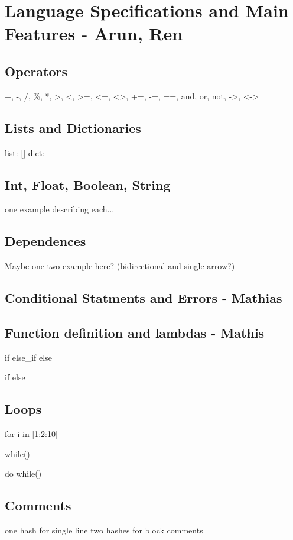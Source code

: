 \section{Language Specifications and Main Features - Arun, Ren}
\label{sect:spec}

\subsection{Operators}
+, -, /, \%, *, >, <, >=, <=, <>, +=, -=, ==, and, or, not, ->, <->

\subsection{Lists and Dictionaries}
list: []
dict: {}

\subsection{Int, Float, Boolean,  String}
one example describing each...

\subsection{Dependences}
Maybe one-two example here? (bidirectional and single arrow?)

\subsection{Conditional Statments and Errors - Mathias}

\subsection{Function definition and lambdas - Mathis}

if {}
else\_if {}
else{}

if {}
else{}


\subsection{Loops}
for i in [1:2:10]{}

while(){}

do{}
while()



\subsection{Comments}
one hash for single line
two hashes for block comments


\label{sect:core}

